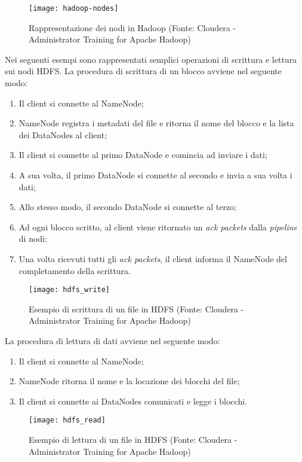 \begin{figure}[!h]
	\centering
	\texttt{[image: hadoop-nodes]}
	\caption{Rappresentazione dei nodi in Hadoop (Fonte: Cloudera - Administrator Training for Apache Hadoop)}
\end{figure}
Nei seguenti esempi sono rappresentati semplici operazioni di scrittura e lettura sui nodi HDFS.
La procedura di scrittura di un blocco avviene nel seguente modo:
\begin{enumerate}
	\item Il client si connette al NameNode;
	\item NameNode registra i metadati del file e ritorna il nome del blocco e la lista dei DataNodes al client;
	\item Il client si connette al primo DataNode e comincia ad inviare i dati;
	\item A sua volta, il primo DataNode si connette al secondo e invia a sua volta i dati;
	\item Allo stesso modo, il secondo DataNode si connette al terzo;
	\item Ad ogni blocco scritto, al client viene ritornato un \textit{ack packets} dalla \textit{pipeline} di nodi;
	\item Una volta ricevuti tutti gli \textit{ack packets}, il client informa il NameNode del completamento della scrittura.
\end{enumerate} 
\begin{figure}[!h]
	\centering
	\texttt{[image: hdfs\_write]}
	\caption{Esempio di scrittura di un file in HDFS (Fonte: Cloudera - Administrator Training for Apache Hadoop)}
\end{figure}
La procedura di lettura di dati avviene nel seguente modo:
\begin{enumerate}
	\item Il client si connette al NameNode;
	\item NameNode ritorna il nome e la locazione dei blocchi del file;
	\item Il client si connette ai DataNodes comunicati e legge i blocchi.
\end{enumerate}
\begin{figure}[!h]
	\centering
	\texttt{[image: hdfs\_read]}
	\caption{Esempio di lettura di un file in HDFS (Fonte: Cloudera - Administrator Training for Apache Hadoop)}
\end{figure}

